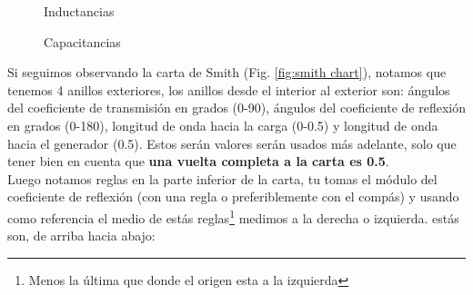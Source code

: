\documentclass[
	12pt, %
	fleqn, %
	a4paper, %
]{LegrandOrangeBook}
\begin{document}
\begin{figure}[]
\centering
{}
\caption{Inductancias}
\label{fig:inductancias smith}
\end{figure}
\begin{figure}[]
\centering
{}
\caption{Capacitancias}
\label{fig:capacitancias smith}
\end{figure}
Si seguimos observando la carta de Smith (Fig. \ref{fig:smith chart}), notamos que tenemos 4 anillos exteriores, los anillos desde el interior al exterior son: ángulos del coeficiente de transmisión en grados (0-90), ángulos del coeficiente de reflexión en grados (0-180), longitud de onda hacia la carga (0-0.5) y longitud de onda hacia el generador (0.5). Estos serán valores serán usados más adelante, solo que tener bien en cuenta que \textbf{una vuelta completa a la carta es 0.5}.\\
Luego notamos reglas en la parte inferior de la carta, tu tomas el módulo del coeficiente de reflexión (con una regla o preferiblemente con el compás) y usando como referencia el medio de estás reglas\footnote{Menos la última que donde el origen esta a la izquierda} medimos a la derecha o izquierda. estás son, de arriba hacia abajo:
\end{document}
